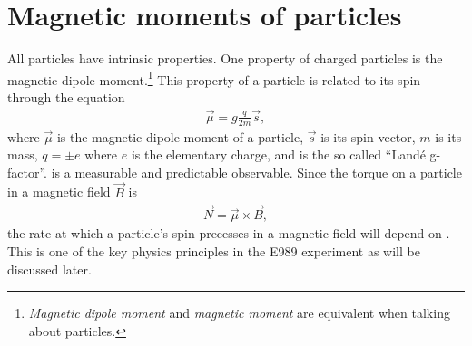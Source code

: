 

\section{Magnetic moments of particles}
\label{sec:MDMs}

All particles have intrinsic properties. One property of charged particles is the magnetic dipole moment.\footnote{\textit{Magnetic dipole moment} and \textit{magnetic moment} are equivalent when talking about particles.} This property of a particle is related to its spin through the equation
		\begin{align}
            \vec{\mu} = g \frac{q}{2m} \vec{s},
        \label{eq:magneticmoment}
		\end{align}
where $\vec{\mu}$ is the magnetic dipole moment of a particle, $\vec{s}$ is its spin vector, $m$ is its mass, $q = \pm e$ where $e$ is the elementary charge, and \g is the so called ``Land\'{e} g-factor''. \g is a measurable and predictable observable. Since the torque on a particle in a magnetic field $\vec{B}$ is 
		\begin{align}
            \vec{N} = \vec{\mu} \times \vec{B},
        \label{eq:torque}
		\end{align}
the rate at which a particle's spin precesses in a magnetic field will depend on \g. This is one of the key physics principles in the E989 experiment as will be discussed later.

